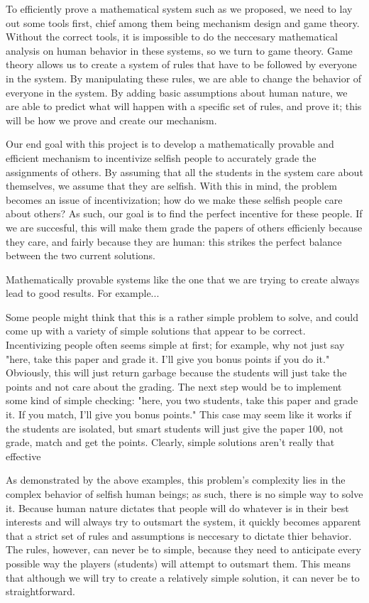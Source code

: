 \documentclass[12pt, Helvetica]{article}
\begin{document}
To efficiently prove a mathematical system such as we proposed, we need to lay out some tools first, chief among them being mechanism design and game theory. Without the correct tools, it is impossible to do the neccesary mathematical analysis on human behavior in these systems, so we turn to game theory. Game theory allows us to create a system of rules that have to be followed by everyone in the system. By manipulating these rules, we are able to change the behavior of everyone in the system. By adding basic assumptions about human nature, we are able to predict what will happen with a specific set of rules, and prove it; this will be how we prove and create our mechanism.

Our end goal with this project is to develop a mathematically provable and efficient mechanism to incentivize selfish people to accurately grade the assignments of others. By assuming that all the students in the system care about themselves, we assume that they are selfish. With this in mind, the problem becomes an issue of incentivization; how do we make these selfish people care about others? As such, our goal is to find the perfect incentive for these people. If we are succesful, this will make them grade the papers of others efficienly because they care, and fairly because they are human: this strikes the perfect balance between the two current solutions.

Mathematically provable systems like the one that we are trying to create always lead to good results. For example...

Some people might think that this is a rather simple problem to solve, and could come up with a variety of simple solutions that appear to be correct. Incentivizing people often seems simple at first; for example, why not just say "here, take this paper and grade it. I'll give you bonus points if you do it." Obviously, this will just return garbage because the students will just take the points and not care about the grading. The next step would be to implement some kind of simple checking: "here, you two students, take this paper and grade it. If you match, I'll give you bonus points." This case may seem like it works if the students are isolated, but smart students will just give the paper 100, not grade, match and get the points. Clearly, simple solutions aren't really that effective

As demonstrated by the above examples, this problem's complexity lies in the complex behavior of selfish human beings; as such, there is no simple way to solve it. Because human nature dictates that people will do whatever is in their best interests and will always try to outsmart the system, it quickly becomes apparent that a strict set of rules and assumptions is neccesary to dictate thier behavior. The rules, however, can never be to simple, because they need to anticipate every possible way the players (students) will attempt to outsmart them. This means that although we will try to create a relatively simple solution, it can never be to straightforward.
\end{document}
